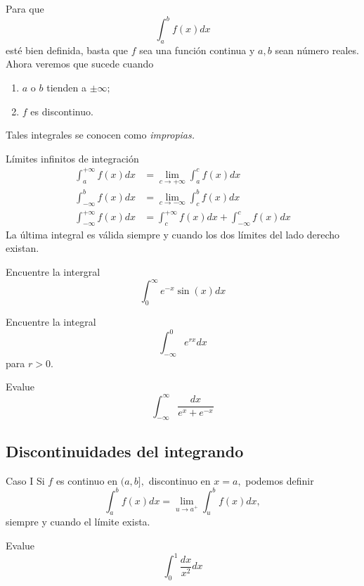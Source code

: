 Para que $$\displaystyle\int_{a}^{b}f(x)dx$$ est\'e bien definida, basta que $f$ sea una funci\'on continua y $a,b$ sean número reales. Ahora veremos que sucede cuando
\begin{enumerate}
 \item  $a$ o $b$ tienden a $\pm \infty;$
 \item $f$ es discontinuo.
\end{enumerate}

Tales integrales se conocen como \emph{impropias.}


{L\'imites infinitos de integraci\'on}
\begin{align}
\label{35.a}
 \displaystyle\int_{a}^{+\infty}f(x)dx &= \lim_{c\to +\infty} \int_{a}^{c}f(x)dx \\
\label{35.b}
 \displaystyle\int_{-\infty}^{b}f(x)dx &= \lim_{c\to -\infty} \int_{c}^{b}f(x)dx \\
 \label{35.c}
 \int_{-\infty}^{+\infty}f(x)dx &= \int_{c}^{+\infty}f(x)dx+\int_{-\infty}^{c}f(x)dx
\end{align}
La última integral es válida siempre y cuando los dos l\'imites del lado derecho existan.



\begin{resuelto}
\label{solved:35.6}
 Encuentre la intergral
 $$\displaystyle \int_{0}^{\infty}e^{-x}\sin(x) dx$$
\end{resuelto}




\begin{resuelto}
 \label{solved:35.4}
Encuentre la integral
$$\displaystyle \int_{-\infty}^{0} e^{rx}dx$$ para $r>0.$
\end{resuelto}




\begin{resuelto}
 \label{solved:35.7}
Evalue
$$
\displaystyle \int_{-\infty}^{\infty}
\dfrac{dx}{e^{x}+e^{-x}}
$$
\end{resuelto}


\subsection{Discontinuidades del integrando}

{Caso I}
Si $f$ es continuo en $(a,b],$ discontinuo en $x=a,$ podemos definir
$$
\displaystyle \int_{a}^{b}f(x)dx=\lim_{u\to a^{+}} \int_{u}^{b}f(x)dx,
$$ siempre y cuando el l\'imite exista.


\begin{resuelto}
 Evalue
 $$\displaystyle \int_{0}^{1}\dfrac{dx}{x^{2}} dx$$
\end{resuelto}



